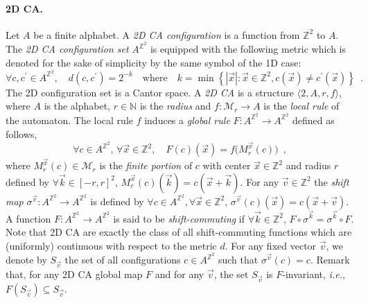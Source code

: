 \documentclass{llncs}
\makeatletter
\newcommand{\n}{\ensuremath{\mathbb{N}}\xspace}
\newcommand{\ie}{\emph{i.e.}\@\xspace}
\newcommand{\sv}{S_{\vec v}}
\newcommand{\zdu}{\ensuremath{\mathbb{Z}^2}\xspace}
\newcommand{\azdu}{\ensuremath{A^{\zdu}}\xspace}
\newcommand{\set}[1]{\left\{#1\right\}}
\newcommand{\kk}{\vec k}
\newcommand{\xx}{\vec x}
\newcommand{\vv}{\vec v}
\newcommand{\Mr}{\ensuremath{\mathcal{M}_r}\xspace}
\newcommand{\ignore}[1]{}
\makeatother
\begin{document}
\paragraph{{\bf 2D CA.}} Let $A$ be a finite alphabet. A \emph{2D CA
configuration} is a function from $\zdu$ to $A$. The \emph{2D CA
configuration set} $\azdu$ is equipped with the following metric
which is denoted for the sake of simplicity by the same symbol of
the 1D case:
\[
  \forall c,c^\prime\in\azdu,\quad d(c,c^\prime)=2^{-k}
  \quad\text{where}\quad k=\min\set{|\xx|:
  \xx\in \zdu, c(\xx)\ne c^\prime(\xx)}\enspace.
\]
The 2D configuration set is a Cantor space.
A \emph{2D CA} is a structure $\langle 2, A, r, f\rangle$, where
$A$ is the alphabet, $r\in\n$ is the \emph{radius} and $f: \Mr \to
A$ is the \emph{local rule} of the automaton. The local rule $f$
induces a \emph{global rule} $F:\azdu\to\azdu$ defined as follows,
\[
\forall c\in \azdu,\,\forall \xx\in\zdu ,\quad F(c)(\xx)=
f\big(M^{\xx}_r(c)\big)\enspace ,
\]
where $M^{\xx}_r(c)\in\Mr$ is the \emph{finite portion} of $c$
with center $\xx\in\zdu$ and radius $r$ defined by $\forall
\kk\in [-r,r]^2$, $M^{\xx}_r(c)(\kk)=c(\xx+\kk)$.
For any $\vv\in\zdu$ the \emph{shift map}
 $\sigma^{\vv}: A^{\zdu} \to A^{\zdu}$ is defined
by $\forall c\in\azdu, \forall \xx\in\zdu$,
$\sigma^{\vv}(c)(\xx)=c(\xx+\vv)$. A function $F:\azdu \to \azdu$
is said to be \emph{shift-commuting} if $\forall \kk\in\zdu$,
$F\circ\sigma^{\kk}=\sigma^{\kk}\circ F$. Note that 2D CA are
exactly the class of all shift-commuting functions which are
(uniformly) continuous with respect to the metric $d$\ignore{(Hedlund's
theorem from~\cite{hedlund69}). A 2D \emph{subshift} $S$ is a
closed subset of the CA configuration space such that for any
$\vv\in\zdu$, $\sigma^{\vv}(S)\subset S$}.
For any fixed vector $\vv$, we denote by $\sv$ the set of all
configurations $c\in\azdu$ such that $\sigma^{\vv}(c)=c$. Remark
that, for any 2D CA global map $F$ and for any $\vv$, the set
$\sv$ is $F$-invariant, \ie, $F(\sv)\subseteq \sv$.
\end{document}
